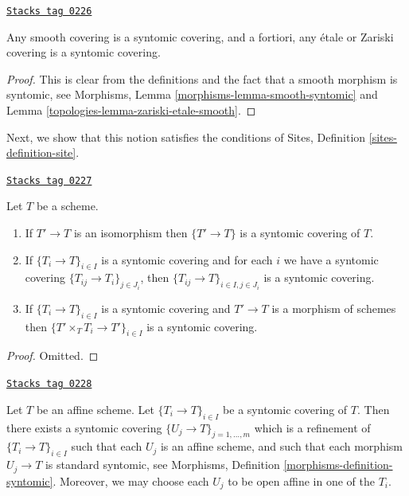 \begin{lemma}
\label{topologies-lemma-zariski-etale-smooth-syntomic}
\href{https://stacks.math.columbia.edu/tag/0226}{\texttt{Stacks tag 0226}}

Any smooth covering is a syntomic covering, and a fortiori,
any \'etale or Zariski covering is a syntomic covering.
\end{lemma}

\begin{proof}

This is clear from the definitions and the fact that a smooth
morphism is syntomic, see
Morphisms, Lemma \ref{morphisms-lemma-smooth-syntomic}
and Lemma \ref{topologies-lemma-zariski-etale-smooth}.
\end{proof}

Next, we show that this notion satisfies the conditions of
Sites, Definition \ref{sites-definition-site}.

\begin{lemma}[Syntomic]
\label{topologies-lemma-syntomic}
\href{https://stacks.math.columbia.edu/tag/0227}{\texttt{Stacks tag 0227}}

Let $T$ be a scheme.
\begin{enumerate}
\item If $T' \to T$ is an isomorphism then $\{T' \to T\}$
is a syntomic covering of $T$.
\item If $\{T_i \to T\}_{i\in I}$ is a syntomic covering and for each
$i$ we have a syntomic covering $\{T_{ij} \to T_i\}_{j\in J_i}$, then
$\{T_{ij} \to T\}_{i \in I, j\in J_i}$ is a syntomic covering.
\item If $\{T_i \to T\}_{i\in I}$ is a syntomic covering
and $T' \to T$ is a morphism of schemes then
$\{T' \times_T T_i \to T'\}_{i\in I}$ is a syntomic covering.
\end{enumerate}
\end{lemma}

\begin{proof}
Omitted.
\end{proof}

\begin{lemma}
\label{topologies-lemma-syntomic-affine}
\href{https://stacks.math.columbia.edu/tag/0228}{\texttt{Stacks tag 0228}}

Let $T$ be an affine scheme.
Let $\{T_i \to T\}_{i \in I}$ be a syntomic covering of $T$.
Then there exists a syntomic covering
$\{U_j \to T\}_{j = 1, \ldots, m}$ which is a refinement
of $\{T_i \to T\}_{i \in I}$ such that each $U_j$ is an affine
scheme, and such that each morphism $U_j \to T$ is standard
syntomic, see Morphisms, Definition \ref{morphisms-definition-syntomic}.
Moreover, we may choose each $U_j$ to be open affine in one of the $T_i$.
\end{lemma}

